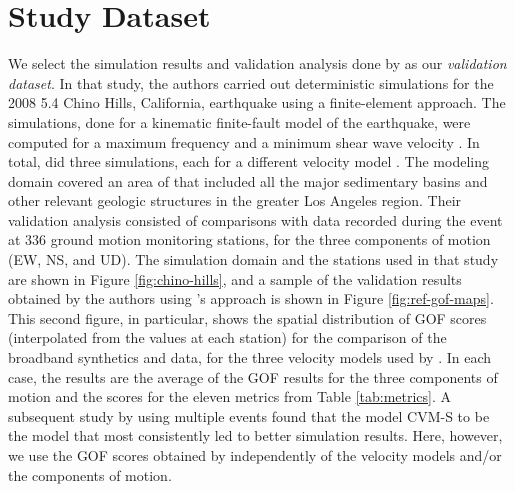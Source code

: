 
\section{Study Dataset}

We select the simulation results and validation analysis done by \citet{Taborda_2014_BSSA} as our \textit{validation dataset}. In that study, the authors carried out deterministic simulations for the 2008  5.4 Chino Hills, California, earthquake using a finite-element approach. The simulations, done for a kinematic finite-fault model of the earthquake, were computed for a maximum frequency  and a minimum shear wave velocity . In total, \citet{Taborda_2014_BSSA} did three simulations, each for a different velocity model \citep[CVM-S4, CVM-H, CVM-H+GTL, see][]{Small_2017_SRL}. The modeling domain covered an area of  that included all the major sedimentary basins and other relevant geologic structures in the greater Los Angeles region. Their validation analysis consisted of comparisons with data recorded during the event at 336 ground motion monitoring stations, for the three components of motion (EW, NS, and UD). The simulation domain and the stations used in that study are shown in Figure \ref{fig:chino-hills}, and a sample of the validation results obtained by the authors using \citeauthor{Anderson_2004_Proc}'s approach is shown in Figure \ref{fig:ref-gof-maps}. This second figure, in particular, shows the spatial distribution of GOF scores (interpolated from the values at each station) for the comparison of the broadband synthetics and data, for the three velocity models used by \citet{Taborda_2014_BSSA}. In each case, the results are the average of the GOF results for the three components of motion and the scores for the eleven metrics from Table \ref{tab:metrics}. A subsequent study by \citet{Taborda_2016_GJI} using multiple events found that the model CVM-S \citep[version 4.26.M01, see][]{Small_2017_SRL} to be the model that most consistently led to better simulation results. Here, however, we use the GOF scores obtained by \citet{Taborda_2014_BSSA} independently of the velocity models and/or the components of motion.

